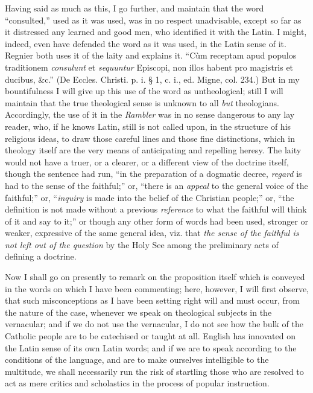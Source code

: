 Having said as much as this, I go further, and
maintain that the word ``consulted,'' used as it was used, was in no
respect unadvisable, except so far as it distressed any learned and good
men, who identified it with the Latin. I might, indeed, even have
defended the word as it was used, in the Latin sense of it. Regnier both
uses it of the laity and explains it. ``Cùm receptam apud populos
traditionem \emph{consulunt} et \emph{sequuntur} Episcopi, non illos
habent pro magistris et ducibus, \&c.'' (De Eccles. Christi. p. i. §
1, c. i., ed. Migne, col. 234.) But in my bountifulness I will give up
this use of the word as untheological; still I will maintain that the
true theological sense is unknown to all \emph{but} theologians.
Accordingly, the use of it in the \emph{Rambler} was in no sense
dangerous to any lay reader, who, if he knows Latin, still is not called
upon, in the structure of his religious ideas, to draw those careful
lines and those fine distinctions, which in theology itself are the very
means of anticipating and repelling heresy. The laity would not have a
truer, or a clearer, or a different view of the doctrine itself, though
the sentence had run, ``in the preparation of a dogmatic decree, \emph{regard}
is had to the sense of the faithful;'' or, ``there is an \emph{appeal} to
the general voice of the faithful;'' or, ``\emph{inquiry} is made into the
belief of the Christian people;'' or, ``the definition is not made without
a previous \emph{reference} to what the faithful will think of it and
say to it;'' or though any other form of words had been used, stronger or
weaker, expressive of the same general idea, viz. that \emph{the sense of
the faithful is not left out of the question} by the Holy See among
the preliminary acts of defining a doctrine.

Now I shall go on presently to remark on the
proposition itself which is conveyed in the words on which I have been
commenting; here, however, I will first observe, that such
misconceptions as I have been setting right will and must occur, from
the nature of the case, whenever we speak on theological subjects in the
vernacular; and if we do not use the vernacular, I do not see how the
bulk of the Catholic people are to be catechised or taught at all.
English has innovated on the Latin sense of its own Latin words; and if
we are to speak according to the conditions of the language, and
are to make ourselves intelligible to the multitude, we shall
necessarily run the risk of startling those who are resolved to act as
mere critics and scholastics in the process of popular instruction.

